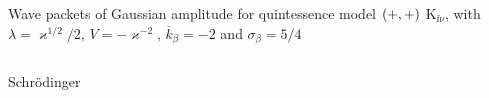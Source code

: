 \documentclass[9pt]{beamer}
\begin{document}
\begin{frame}%
{Wave packets of Gaussian amplitude for quintessence model ${\left(+,+\right)}$}%
{$\mathrm{K}_{\ii\nu}$, with $\lambda = \varkappa^{1/2}/2$,
$V = -\varkappa^{-2}$, $\overline{k}_\beta = -2$ and $\sigma_\beta = 5/4$}
\begin{columns}
\begin{column}{.49\textwidth}
\begin{block}{Schrödinger}

\end{block}
\end{column}
\end{columns}
\end{frame}
\end{document}
